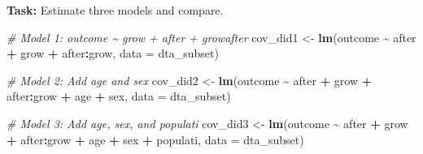 \documentclass[
]{article}
\newenvironment{Shaded}{\begin{snugshade}}{\end{snugshade}}
\newcommand{\AttributeTok}[1]{\textcolor[rgb]{0.13,0.29,0.53}{#1}}
\newcommand{\CommentTok}[1]{\textcolor[rgb]{0.56,0.35,0.01}{\textit{#1}}}
\newcommand{\FunctionTok}[1]{\textcolor[rgb]{0.13,0.29,0.53}{\textbf{#1}}}
\newcommand{\NormalTok}[1]{#1}
\newcommand{\OtherTok}[1]{\textcolor[rgb]{0.56,0.35,0.01}{#1}}
\newcommand{\SpecialCharTok}[1]{\textcolor[rgb]{0.81,0.36,0.00}{\textbf{#1}}}
\begin{document}
\textbf{Task:} Estimate three models and compare.

\begin{Shaded}
\begin{Highlighting}[]
\CommentTok{\# Model 1: outcome \textasciitilde{} grow + after + growafter}
\NormalTok{cov\_did1 }\OtherTok{\textless{}{-}} \FunctionTok{lm}\NormalTok{(outcome }\SpecialCharTok{\textasciitilde{}}\NormalTok{ after }\SpecialCharTok{+}\NormalTok{ grow }\SpecialCharTok{+}\NormalTok{ after}\SpecialCharTok{:}\NormalTok{grow, }\AttributeTok{data =}\NormalTok{ dta\_subset)}
\end{Highlighting}
\end{Shaded}

\begin{Shaded}
\begin{Highlighting}[]
\CommentTok{\# Model 2: Add age and sex}
\NormalTok{cov\_did2 }\OtherTok{\textless{}{-}} \FunctionTok{lm}\NormalTok{(outcome }\SpecialCharTok{\textasciitilde{}}\NormalTok{ after }\SpecialCharTok{+}\NormalTok{ grow }\SpecialCharTok{+}\NormalTok{ after}\SpecialCharTok{:}\NormalTok{grow }\SpecialCharTok{+}\NormalTok{ age }\SpecialCharTok{+}\NormalTok{ sex, }\AttributeTok{data =}\NormalTok{ dta\_subset)}
\end{Highlighting}
\end{Shaded}

\begin{Shaded}
\begin{Highlighting}[]
\CommentTok{\# Model 3: Add age, sex, and populati}
\NormalTok{cov\_did3 }\OtherTok{\textless{}{-}} \FunctionTok{lm}\NormalTok{(outcome }\SpecialCharTok{\textasciitilde{}}\NormalTok{ after }\SpecialCharTok{+}\NormalTok{ grow }\SpecialCharTok{+}\NormalTok{ after}\SpecialCharTok{:}\NormalTok{grow }\SpecialCharTok{+}\NormalTok{ age }\SpecialCharTok{+}\NormalTok{ sex }\SpecialCharTok{+}\NormalTok{ populati, }\AttributeTok{data =}\NormalTok{ dta\_subset)}
\end{Highlighting}
\end{Shaded}
\end{document}

